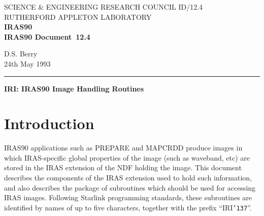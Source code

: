 \pagestyle{myheadings}

\newcommand{\irasdoccategory}  {IRAS90 Document}
\newcommand{\irasdocinitials}  {ID}
\newcommand{\irasdocnumber}    {12.4}
\newcommand{\irasdocauthors}   {D.S. Berry}
\newcommand{\irasdocdate}      {24th May 1993}
\newcommand{\irasdoctitle}     {IRI: IRAS90 Image Handling Routines}

\newcommand{\numcir}[1]{\mbox{\hspace{3ex}$\bigcirc$\hspace{-1.7ex}{\small #1}}}
\newcommand{\irasdocname}{\irasdocinitials /\irasdocnumber}
\renewcommand{\_}{{\tt\char'137}}     %
\markright{\irasdocname}
\setlength{\textwidth}{160mm}
\setlength{\textheight}{240mm}
\setlength{\topmargin}{-5mm}
\setlength{\oddsidemargin}{0mm}
\setlength{\evensidemargin}{0mm}
\setlength{\parindent}{0mm}
\setlength{\parskip}{\medskipamount}
\setlength{\unitlength}{1mm}



\thispagestyle{empty}
SCIENCE \& ENGINEERING RESEARCH COUNCIL \hfill \irasdocname\\
RUTHERFORD APPLETON LABORATORY\\
{\large\bf IRAS90\\}
{\large\bf \irasdoccategory\ \irasdocnumber}
\begin{flushright}
\irasdocauthors\\
\irasdocdate
\end{flushright}
\vspace{-4mm}
\rule{\textwidth}{0.5mm}
\vspace{5mm}
\begin{center}
{\Large\bf \irasdoctitle}
\end{center}
\vspace{5mm}
\setlength{\parskip}{0mm}
\tableofcontents
\setlength{\parskip}{\medskipamount}
\markright{\irasdocname}

\section{Introduction}
IRAS90 applications such as PREPARE and MAPCRDD produce images in which
IRAS-specific global properties of the image (such as waveband, etc) are stored
in the IRAS extension of the NDF holding the image. This document describes the
components of the IRAS extension used to hold such information, and also
describes the package of subroutines which should be used for accessing IRAS
images. Following Starlink programming standards, these subroutines are
identified by names of up to five characters, together with the prefix
``IRI\_''. 

